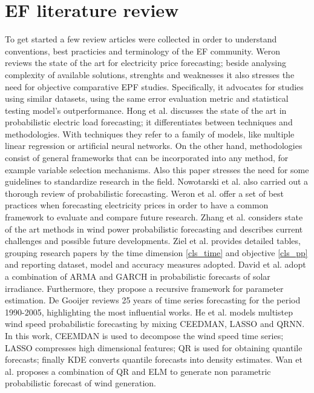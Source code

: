 \section{EF literature review}
To get started a few review articles were collected in order to understand conventions, best practicies and terminology of the EF community.
Weron \cite{EPF_review} reviews the state of the art for electricity price forecasting; beside analysing complexity of available solutions, strenghts and weaknesses it also stresses the need for objective comparative EPF studies. Specifically, it advocates for studies using similar datasets, using the same error evaluation metric and statistical testing model's outperformance.
Hong et al. \cite{prob_elf} discusses the state of the art in probabilistic electric load forecasting; it differentiates between techniques and methodologies. With techniques they refer to a family of models, like multiple linear regression or artificial neural networks. On the other hand, methodologies consist of general frameworks that can be incorporated into any method, for example variable selection mechanisms. Also this paper stresses the need for some guidelines to standardize research in the field.
Nowotarski et al. \cite{nowotarski} also carried out a thorough review of probabilistic forecasting.
Weron et al. \cite{lago} offer a set of best practices when forecasting electricity prices in order to have a common framework to evaluate and compare future research.
Zhang et al. \cite{zhang2014review} considers state of the art methods in wind power probabilistic forecasting and describes current challenges and possible future developments.
Ziel et al. \cite{ziel2018probabilistic} provides detailed tables, grouping research papers by the time dimension \ref{cls_time} and objective \ref{cls_pp} and reporting dataset, model and accuracy 
measures adopted.
David et al. \cite{david2016probabilistic} adopt a combination of ARMA and GARCH in probabilistic forecasts of solar irradiance. Furthermore, they propose a recursive framework for parameter estimation.
De Gooijer \cite{de200625} reviews 25 years of time series forecasting for the period 1990-2005, highlighting the most influential works.
He et al. \cite{he2022cooperative} models  multistep wind speed probabilistic forecasting by mixing CEEDMAN, LASSO and QRNN. In this work, CEEMDAN is used to decompose the wind speed time series; LASSO compresses high dimensional features; QR is used for obtaining quantile forecasts; finally KDE converts quantile forecasts into density estimates.
Wan et al. \cite{wan2016direct} proposes a combination of QR and ELM to generate non parametric probabilistic forecast of wind generation.
